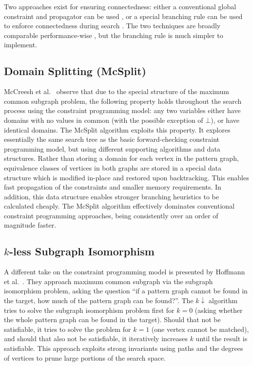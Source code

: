 \documentclass{llncs}
\begin{document}
Two approaches exist for ensuring connectedness: either a conventional global constraint and
propagator can be used \cite{DBLP:conf/cp/McCreeshNPS16}, or a special branching rule can be used
to enforce connectedness during search \cite{DBLP:conf/mco/VismaraV08}. The two techniques are
broadly comparable performance-wise \cite{DBLP:conf/cp/McCreeshNPS16}, but the branching rule is
much simpler to implement.

\subsection{Domain Splitting (McSplit)}

McCreesh et al.\ \cite{o:McCreeshPT17} observe that due to the special structure of the maximum
common subgraph problem, the following property holds throughout the search process using the
constraint programming model: any two variables either have domains with no values in common (with
the possible exception of $\bot$), or have identical domains. The McSplit algorithm exploits this
property. It explores essentially the same search tree as the basic forward-checking constraint
programming model, but using different supporting algorithms and data structures.  Rather than
storing a domain for each vertex in the pattern graph, equivalence classes of vertices in both
graphs are stored in a special data structure which is modified in-place and restored upon
backtracking. This enables fast propagation of the constraints and smaller memory requirements. In
addition, this data structure enables stronger branching heuristics to be calculated cheaply. The
McSplit algorithm effectively dominates conventional constraint programming approaches, being
consistently over an order of magnitude faster.

\subsection{$k$-less Subgraph Isomorphism}

A different take on the constraint programming model is presented by
Hoffmann et al.\ \cite{DBLP:conf/aaai/HoffmannMR17}. They approach maximum common subgraph via the
subgraph isomorphism problem, asking the question ``if a pattern graph cannot be found in the
target, how much of the pattern graph can be found?''. The $k{\downarrow}$ algorithm tries to solve
the subgraph isomorphism problem first for $k=0$ (asking whether the whole pattern graph can be found in the
target). Should that not be satisfiable, it tries to solve the problem for $k=1$ (one vertex cannot
be matched), and should that also not be satisfiable, it iteratively increases $k$ until the result
is satisfiable. This approach exploits strong invariants using paths and the degrees of vertices to
prune large portions of the search space.
\end{document}
